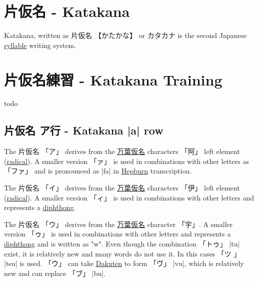 \documentclass[paper=a4,headings=small,titlepage,makeidx,fontsize=12pt]{scrbook}
\begin{document}
\pagestyle{plain}
\frontmatter
\maketitle

\tableofcontents
\pagestyle{fancy}

\mainmatter

\chapter{片仮名 - Katakana}


\bigskip

Katakana, written as {片仮名 【かたかな】} or {カタカナ} is the second Japanese
\hyperref[sec:Syllable]{syllable} writing system. 



\chapter{片仮名練習 - Katakana Training}

todo
\newpage
\section{片仮名 ア行 - Katakana |a| row}


The 片仮名 {「ア」} derives from the
\hyperref[sec:Manyogana]{万葉仮名} characters {「阿」} left element
(\hyperref[sec:Radical]{radical}).  A smaller version {「ァ」} is used in
combinations with other letters as {「ファ」} and is pronounced as |fa| in
\hyperref[sec:Hepburn]{Hepburn} transcription.

The 片仮名 {「イ」} derives from the
\hyperref[sec:Manyogana]{万葉仮名} characters {「伊」} left element
(\hyperref[sec:Radical]{radical}).  A smaller version {「ィ」} is used in
combinations with other letters and represents a
\hyperref[sec:Diphthong]{diphthong}. 

The 片仮名 {「ウ」} derives from the
\hyperref[sec:Manyogana]{万葉仮名} character {「宇」}. A smaller version
{「ゥ」} is used in combinations with other letters and represents a
\hyperref[sec:Diphthong]{diphthong} and is written as "w". Even though the
combination {「トゥ」} |tu| exist, it is relatively new and many words do not
use it. In this cases {「ツ 」} |tsu| is used. {「ウ」} can take
\hyperref[sec:Dakuten]{Dakuten} to form {「ヴ」} |vu|, which is relatively new
and can replace {「ブ」} |bu|. 
\end{document}
